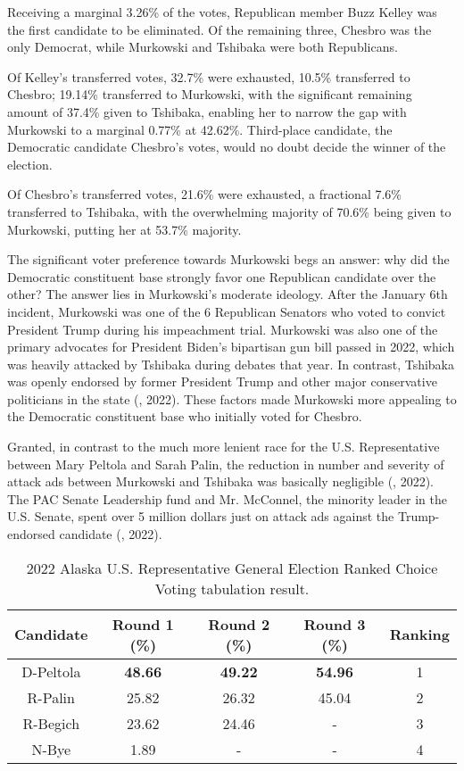 Receiving a marginal 3.26\% of the votes, Republican member Buzz Kelley was the first candidate to be eliminated. Of the remaining three, Chesbro was the only Democrat, while Murkowski and Tshibaka were both Republicans. 

Of Kelley’s transferred votes, 32.7\% were exhausted, 10.5\% transferred to Chesbro; 19.14\% transferred to Murkowski, with the significant remaining amount of 37.4\% given to Tshibaka, enabling her to narrow the gap with Murkowski to a marginal 0.77\% at 42.62\%. Third-place candidate, the Democratic candidate Chesbro’s votes, would no doubt decide the winner of the election. 

Of Chesbro’s transferred votes, 21.6\% were exhausted, a fractional 7.6\% transferred to Tshibaka, with the overwhelming majority of 70.6\% being given to Murkowski, putting her at 53.7\% majority. 

The significant voter preference towards Murkowski begs an answer: why did the Democratic constituent base strongly favor one Republican candidate over the other? The answer lies in Murkowski’s moderate ideology. After the January 6th incident, Murkowski was one of the 6 Republican Senators who voted to convict President Trump during his impeachment trial. Murkowski was also one of the primary advocates for President Biden’s bipartisan gun bill passed in 2022, which was heavily attacked by Tshibaka during debates that year. In contrast, Tshibaka was openly endorsed by former President Trump and other major conservative politicians in the state (\cite{gomez2022}, 2022). These factors made Murkowski more appealing to the Democratic constituent base who initially voted for Chesbro.

Granted, in contrast to the much more lenient race for the U.S. Representative between Mary Peltola and Sarah Palin, the reduction in number and severity of attack ads between Murkowski and Tshibaka was basically negligible (\cite{shivaram2022}, 2022). The PAC Senate Leadership fund and Mr. McConnel, the minority leader in the U.S. Senate, spent over 5 million dollars just on attack ads against the Trump-endorsed candidate (\cite{ulloa2022}, 2022). 

\begin{table}[h]
\centering
\begin{tabular}{|c|c|c|c|c|}
\hline
Candidate & Round 1 (\%) & Round 2 (\%) & Round 3 (\%) & Ranking \\ \hline
D-Peltola & \textbf{48.66} & \textbf{49.22} & \textbf{54.96} & 1 \\ \hline
R-Palin & 25.82 & 26.32 & 45.04 & 2 \\ \hline
R-Begich & 23.62 & 24.46 & - & 3 \\ \hline
N-Bye & 1.89 & - & - & 4 \\ \hline
\end{tabular}
\caption{2022 Alaska U.S. Representative General Election Ranked Choice Voting tabulation result.}
\label{tab:5}
\end{table}

